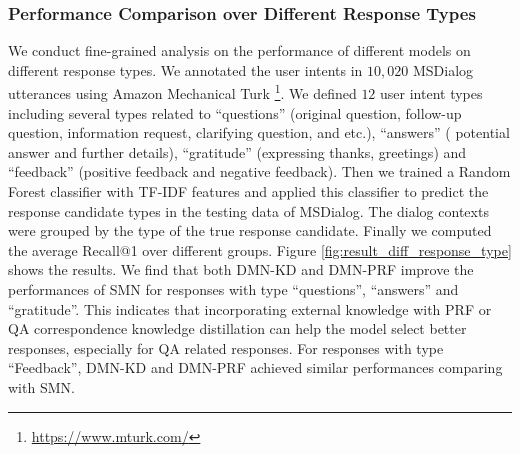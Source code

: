 \subsubsection{\textbf{Performance Comparison over Different Response Types}}
We conduct fine-grained analysis on the performance of different models on different response types. We annotated the user intents in $10,020$ MSDialog utterances using Amazon Mechanical Turk \footnote{\url{https://www.mturk.com/}}. We defined $12$ user intent types including several types related to ``questions'' (original question, follow-up question, information request, clarifying question, and etc.), ``answers'' ( potential answer and further details), ``gratitude'' (expressing thanks, greetings) and ``feedback'' (positive feedback and negative feedback). Then we trained a Random Forest classifier with TF-IDF features and applied this classifier to predict the response candidate types in the testing data of MSDialog.  The dialog contexts were grouped by the type of the true response candidate. Finally we computed the average Recall@1 over different groups. Figure \ref{fig:result_diff_response_type} shows the results. We find that both DMN-KD and DMN-PRF improve the performances of SMN for responses with type ``questions'', ``answers'' and ``gratitude''. This indicates that incorporating external knowledge with PRF or QA correspondence knowledge distillation can help the model select better responses, especially for QA related responses. For responses with type ``Feedback'', DMN-KD and DMN-PRF achieved similar performances comparing with SMN.




